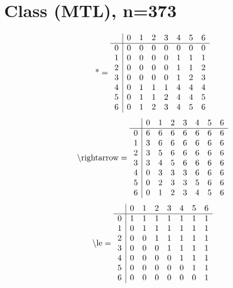 \documentclass[11pt]{article}
\begin{document}
\section{Class (MTL), n=373}
\[\text{*} = 
\begin{array}{r | r r r r r r r}
 & 0 & 1 & 2 & 3 & 4 & 5 & 6 \\ \hline
0 & 0 & 0 & 0 & 0 & 0 & 0 & 0 \\
1 & 0 & 0 & 0 & 0 & 1 & 1 & 1 \\
2 & 0 & 0 & 0 & 0 & 1 & 1 & 2 \\
3 & 0 & 0 & 0 & 0 & 1 & 2 & 3 \\
4 & 0 & 1 & 1 & 1 & 4 & 4 & 4 \\
5 & 0 & 1 & 1 & 2 & 4 & 4 & 5 \\
6 & 0 & 1 & 2 & 3 & 4 & 5 & 6 \\
\end{array}
\]
\[\text{\textbackslash rightarrow} = 
\begin{array}{r | r r r r r r r}
 & 0 & 1 & 2 & 3 & 4 & 5 & 6 \\ \hline
0 & 6 & 6 & 6 & 6 & 6 & 6 & 6 \\
1 & 3 & 6 & 6 & 6 & 6 & 6 & 6 \\
2 & 3 & 5 & 6 & 6 & 6 & 6 & 6 \\
3 & 3 & 4 & 5 & 6 & 6 & 6 & 6 \\
4 & 0 & 3 & 3 & 3 & 6 & 6 & 6 \\
5 & 0 & 2 & 3 & 3 & 5 & 6 & 6 \\
6 & 0 & 1 & 2 & 3 & 4 & 5 & 6 \\
\end{array}
\]
\[\text{\textbackslash le} = 
\begin{array}{r | r r r r r r r}
 & 0 & 1 & 2 & 3 & 4 & 5 & 6 \\ \hline
0 & 1 & 1 & 1 & 1 & 1 & 1 & 1 \\
1 & 0 & 1 & 1 & 1 & 1 & 1 & 1 \\
2 & 0 & 0 & 1 & 1 & 1 & 1 & 1 \\
3 & 0 & 0 & 0 & 1 & 1 & 1 & 1 \\
4 & 0 & 0 & 0 & 0 & 1 & 1 & 1 \\
5 & 0 & 0 & 0 & 0 & 0 & 1 & 1 \\
6 & 0 & 0 & 0 & 0 & 0 & 0 & 1 \\
\end{array}
\]
\end{document}
